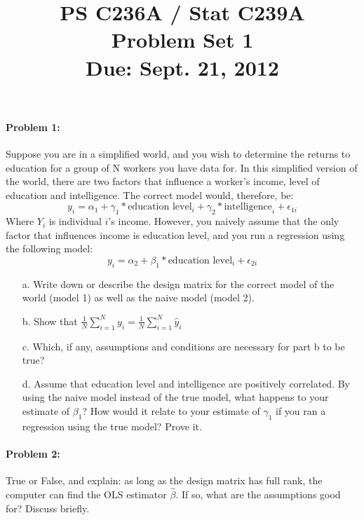 \documentclass{article}
\title{PS C236A / Stat C239A \\ Problem Set 1 \\ Due: Sept. 21, 2012}
\date{}
\begin{document}
\maketitle

\paragraph{Problem 1:}
Suppose you are in a simplified world, and you wish to determine the returns to education for a group of N workers you have data for.  In this simplified version of the world, there are two factors that influence a worker's income, level of education and intelligence.  The correct model would, therefore, be:
\begin{equation} y_{i} = \alpha_{1} + \gamma_{1}*\text{education level}_{i} + \gamma_{2}*\text{intelligence}_{i} + \epsilon_{1i} \end{equation}
Where $Y_{i}$ is individual $i$'s income.  However, you naively assume that the only factor that influences income is education level, and you run a regression using the following model:
\begin{equation} y_{i} = \alpha_{2} + \beta_{1}*\text{education level}_{i} + \epsilon_{2i}  \end{equation}
\begin{itemize}

\item[a.] Write down or describe the design matrix for the correct model of the world (model 1) as well as the naive model (model 2).
\item[b.] Show that $\frac{1}{N}\sum_{i = 1}^N y_{i} = \frac{1}{N}\sum_{i = 1}^N \hat{y}_{i}$
\item[c.] Which, if any, assumptions and conditions are necessary for part b to be true?
\item[d.] Assume that education level and intelligence are positively correlated.  By using the naive model instead of the true model, what happens to your estimate of $\beta_{1}$?  How would it relate to your estimate of $\gamma_{1}$ if you ran a regression using the true model?  Prove it.
\end{itemize}

\paragraph{Problem 2:} True or False, and explain: as long as the design matrix has full rank, the computer can find the OLS estimator $\hat{\beta}$.  If so, what are the assumptions good for? Discuss briefly.
\end{document}
